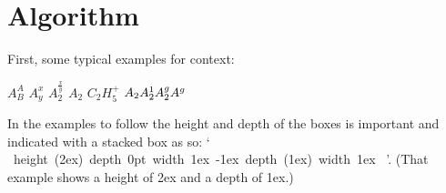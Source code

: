\documentclass{article}
\def\cs#1{\texttt{\char`\\#1}}
\begin{document}
\section{Algorithm}

\makeatletter

First, some typical examples for context:
\def\YPOS{%
  \pdfsavepos\write-1{\the\pdflastypos}%
}
\begin{center}
    $A^{A}_{B}$\quad
    $A^{x}_{y}$\quad
    $A^{\frac{x}{y}}_{2}$\quad
    $A_2$\quad
    $C_2H_5^+$\quad
    $A_{2\YPOS}A^1_{2\YPOS}A^g_{2\YPOS}A^g$
\end{center}


\newcommand\HDrule[2]{%
  \hbox{%
    {\color{red}\vrule height \dimexpr(#1) depth 0pt width 1ex\relax}%
    \kern-1ex\relax
    {\color{black}\vrule height 0pt depth \dimexpr(#2) width 1ex\relax}%
  }%
}

\def\supsym#1{%
  \smash{\color{red}%
    \makebox[0pt][l]{\rule[-0.4pt]{0.7cm}{0.4pt}}
    \rule
      [-\the\fontdimen#1\textfont2]
      {0.4pt}{\the\fontdimen#1\textfont2}}
   i}
\def\subsym#1{%
  \smash{\color{red}%
    \makebox[0pt][l]{\rule[-0.4pt]{0.7cm}{0.4pt}}
    \rule{0.4pt}{\the\fontdimen#1\textfont2}}
   i}

\savebox\@tempboxa{$~$}%
\edef\reset{%
   \fontdimen13\noexpand\textfont2=\the\fontdimen13\textfont2
   \fontdimen14\noexpand\textfont2=\the\fontdimen14\textfont2
   \fontdimen15\noexpand\textfont2=\the\fontdimen15\textfont2
   \fontdimen16\noexpand\textfont2=\the\fontdimen16\textfont2
   \fontdimen17\noexpand\textfont2=\the\fontdimen17\textfont2
 }

\def\a#1{\noindent
{\footnotesize\ttfamily1.5\cs{fontdimen#1}:}
\hfill
\reset$\displaystyle\sum A^{\supsym{13}}$\quad
\fontdimen#1\textfont2=1.5\fontdimen#1\textfont2
$\displaystyle A^{\supsym{13}}$\hfill
\reset$\sum A^{\supsym{14}}$\quad
\fontdimen#1\textfont2=1.5\fontdimen#1\textfont2
$A^{\supsym{14}}$\hfill
\reset$\sqrt{A^{\supsym{15}}}$\quad
\fontdimen#1\textfont2=1.5\fontdimen#1\textfont2
$\sqrt{A^{\supsym{15}}}$\hfill
\reset\null\par\bigskip}

\def\b#1{\noindent
{\footnotesize\ttfamily2\cs{fontdimen#1}:}\hfill
\reset$A_{\subsym{16}}$\quad
\fontdimen#1\textfont2=2\fontdimen#1\textfont2
$A_{\subsym{16}}$\hfill
\reset$A^B_{\subsym{17}}$\quad
\fontdimen#1\textfont2=2\fontdimen#1\textfont2
$A^B_{\subsym{17}}$\hfill
\reset\null\par\bigskip}

In the examples to follow the height and depth of the boxes is important and indicated with a stacked box as so: `\HDrule{2ex}{1ex}'. (That example shows a height of 2ex and a depth of 1ex.)
\end{document}
